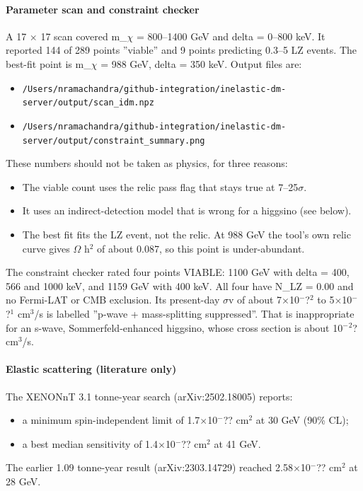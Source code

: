 \documentclass[11pt,a4paper]{article}
\begin{document}
\paragraph{Parameter scan and constraint checker}
A 17 $\times$ 17 scan covered m\_$\chi$ = 800--1400 GeV and delta = 0--800 keV. It reported 144 of 289 points ''viable'' and 9 points predicting 0.3--5 LZ events. The best-fit point is m\_$\chi$ = 988 GeV, delta = 350 keV. Output files are:

\begin{itemize}
  \item \texttt{/\allowbreak{}Users/\allowbreak{}nramachandra/\allowbreak{}github-integration/\allowbreak{}inelastic-dm-server/\allowbreak{}output/\allowbreak{}scan\_\allowbreak{}idm.npz}
  \item \texttt{/\allowbreak{}Users/\allowbreak{}nramachandra/\allowbreak{}github-integration/\allowbreak{}inelastic-dm-server/\allowbreak{}output/\allowbreak{}constraint\_\allowbreak{}summary.png}
\end{itemize}
These numbers should not be taken as physics, for three reasons:

\begin{itemize}
  \item The viable count uses the relic pass flag that stays true at 7--25$\sigma$.
  \item It uses an indirect-detection model that is wrong for a higgsino (see below).
  \item The best fit fits the LZ event, not the relic. At 988 GeV the tool's own relic curve gives $\Omega$ h$^2$ of about 0.087, so this point is under-abundant.
\end{itemize}
The constraint checker rated four points VIABLE: 1100 GeV with delta = 400, 566 and 1000 keV, and 1159 GeV with 400 keV. All four have N\_LZ = 0.00 and no Fermi-LAT or CMB exclusion. Its present-day $\sigma$v of about 7$\times$10$^-$?$^2$ to 5$\times$10$^-$?$^1$ cm$^3$/s is labelled ''p-wave + mass-splitting suppressed''. That is inappropriate for an s-wave, Sommerfeld-enhanced higgsino, whose cross section is about 10$^-$$^2$? cm$^3$/s.

\paragraph{Elastic scattering (literature only)}
The XENONnT 3.1 tonne-year search (arXiv:2502.18005) reports:

\begin{itemize}
  \item a minimum spin-independent limit of 1.7$\times$10$^-$?? cm$^2$ at 30 GeV (90\% CL);
  \item a best median sensitivity of 1.4$\times$10$^-$?? cm$^2$ at 41 GeV.
\end{itemize}
The earlier 1.09 tonne-year result (arXiv:2303.14729) reached 2.58$\times$10$^-$?? cm$^2$ at 28 GeV.
\end{document}
